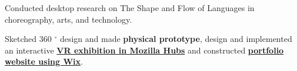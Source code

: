 



\vspace{-1.0mm}
\resumeItemListStart
\item Conducted desktop research on The Shape and Flow of Languages in choreography, arts, and technology.
\item Sketched 360 $ ^\circ $ design and made \textbf{physical prototype}, design and implemented an interactive \href{https://hubs.mozilla.com/HUwkA6r/sturdy-experienced-exploration}{\textbf{VR exhibition in Mozilla Hubs}} and constructed \href{https://yangziqi0605.wixsite.com/shape-flow-language}{\textbf{portfolio website using Wix}}.
\resumeItemListEnd
    \vspace{-1.0mm}

